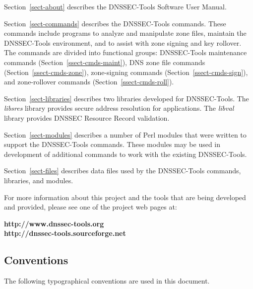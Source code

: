 \documentclass[12pt]{article}
\newcommand{\lib}[1]{{\em #1}}
\newcommand{\url}[1]{{\bf #1}}
\begin{document}
\begin{description}

\item
Section~\ref{sect-about} describes the DNSSEC-Tools Software User Manual.

\item
Section~\ref{sect-commands} describes the DNSSEC-Tools commands.  These
commands include programs to analyze and manipulate zone files, maintain the
DNSSEC-Tools environment, and to assist with zone signing and key rollover.
The commands are divided into functional groups:
DNSSEC-Tools maintenance commands (Section~\ref{ssect-cmds-maint}),
DNS zone file commands (Section~\ref{ssect-cmds-zone}),
zone-signing commands (Section~\ref{ssect-cmds-sign}), and
zone-rollover commands (Section~\ref{ssect-cmds-roll}).

\item
Section~\ref{sect-libraries} describes two libraries developed for
DNSSEC-Tools.  The \lib{libsres} library provides secure address resolution
for applications.  The \lib{libval} library provides DNSSEC Resource Record
validation.

\item
Section~\ref{sect-modules} describes a number of Perl modules that were
written to support the DNSSEC-Tools commands.  These modules may be used in
development of additional commands to work with the existing DNSSEC-Tools.

\item
Section~\ref{sect-files} describes data files used by the DNSSEC-Tools
commands, libraries, and modules.

\end{description}

For more information about this project and the tools that are being developed
and provided, please see one of the project web pages at:

\url{http://www.dnssec-tools.org}  \\
\url{http://dnssec-tools.sourceforge.net}


\clearpage

\subsection{\bf Conventions}

The following typographical conventions are used in this document.
\end{document}
